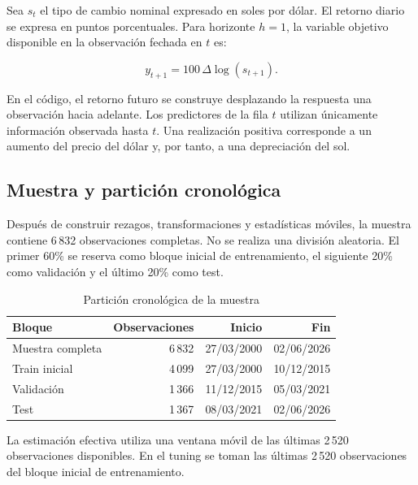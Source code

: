 \documentclass[11pt,a4paper]{article}
\begin{document}
Sea \(s_t\) el tipo de cambio nominal expresado en soles por dólar. El retorno
diario se expresa en puntos porcentuales. Para horizonte \(h=1\), la variable
objetivo disponible en la observación fechada en \(t\) es:

\begin{equation}
  y_{t+1} = 100\,\Delta \log(s_{t+1}).
\end{equation}

En el código, el retorno futuro se construye desplazando la respuesta una
observación hacia adelante. Los predictores de la fila \(t\) utilizan
únicamente información observada hasta \(t\). Una realización positiva
corresponde a un aumento del precio del dólar y, por tanto, a una
depreciación del sol.

\subsection{Muestra y partición cronológica}

Después de construir rezagos, transformaciones y estadísticas móviles, la
muestra contiene 6\,832 observaciones completas. No se realiza una división
aleatoria. El primer 60\% se reserva como bloque inicial de entrenamiento,
el siguiente 20\% como validación y el último 20\% como test.

\begin{table}[H]
\centering
\caption{Partición cronológica de la muestra}
\label{tab:sample}
\begin{threeparttable}
\begin{tabular}{lrrr}
\toprule
Bloque & Observaciones & Inicio & Fin \\
\midrule
Muestra completa & 6\,832 & 27/03/2000 & 02/06/2026 \\
Train inicial & 4\,099 & 27/03/2000 & 10/12/2015 \\
Validación & 1\,366 & 11/12/2015 & 05/03/2021 \\
Test & 1\,367 & 08/03/2021 & 02/06/2026 \\
\bottomrule
\end{tabular}
\begin{tablenotes}[flushleft]\footnotesize
\item La estimación efectiva utiliza una ventana móvil de las últimas 2\,520
observaciones disponibles. En el tuning se toman las últimas 2\,520
observaciones del bloque inicial de entrenamiento.
\end{tablenotes}
\end{threeparttable}
\end{table}
\end{document}
